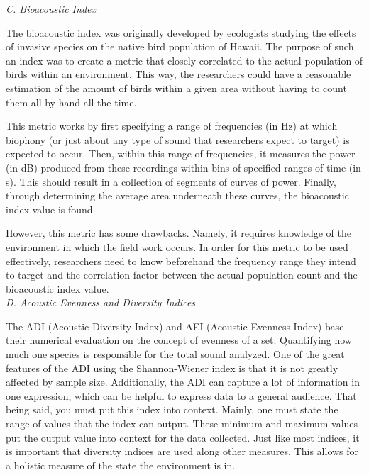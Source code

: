 \begin{flushleft}
\noindent\textit{C. Bioacoustic Index}\par
The bioacoustic index was originally developed by ecologists studying the effects of invasive species on the native bird population of Hawaii.\cite{boelman} The purpose of such an index was to create a metric that closely correlated to the actual population of birds within an environment. This way, the researchers could have a reasonable estimation of the amount of birds within a given area without having to count them all by hand all the time.\par
This metric works by first specifying a range of frequencies (in Hz) at which biophony (or just about any type of sound that researchers expect to target) is expected to occur. Then, within this range of frequencies, it measures the power (in dB) produced from these recordings within bins of specified ranges of time (in s). This should result in a collection of segments of curves of power. Finally, through determining the average area underneath these curves, the bioacoustic index value is found.\par
However, this metric has some drawbacks. Namely, it requires knowledge of the environment in which the field work occurs. In order for this metric to be used effectively, researchers need to know beforehand the frequency range they intend to target and the correlation factor between the actual population count and the bioacoustic index value.\\[4pt]

\noindent\textit{D. Acoustic Evenness and Diversity Indices}\par
The ADI (Acoustic Diversity Index) and AEI (Acoustic Evenness Index) base their numerical evaluation on the concept of evenness of a set. Quantifying how much one species is responsible for the total sound analyzed. One of the great features of the ADI using the Shannon-Wiener index is that it is not greatly affected by sample size. Additionally, the ADI can capture a lot of information in one expression, which can be helpful to express data to a general audience. That being said, you must put this index into context. Mainly, one must state the range of values that the index can output. These minimum and maximum values put the output value into context for the data collected. Just like most indices, it is important that diversity indices are used along other measures. This allows for a holistic measure of the state the environment is in.\cite{shannonWiener}

\end{flushleft}
